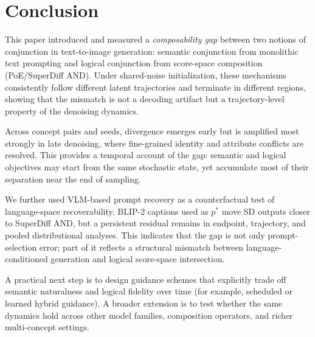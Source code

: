 
\section{Conclusion}

This paper introduced and measured a \emph{composability gap} between two notions of conjunction in text-to-image generation: semantic conjunction from monolithic text prompting and logical conjunction from score-space composition (PoE/SuperDiff AND). Under shared-noise initialization, these mechanisms consistently follow different latent trajectories and terminate in different regions, showing that the mismatch is not a decoding artifact but a trajectory-level property of the denoising dynamics.

Across concept pairs and seeds, divergence emerges early but is amplified most strongly in late denoising, where fine-grained identity and attribute conflicts are resolved. This provides a temporal account of the gap: semantic and logical objectives may start from the same stochastic state, yet accumulate most of their separation near the end of sampling.

We further used VLM-based prompt recovery as a counterfactual test of language-space recoverability. BLIP-2 captions used as \(p^*\) move SD outputs closer to SuperDiff AND, but a persistent residual remains in endpoint, trajectory, and pooled distributional analyses. This indicates that the gap is not only prompt-selection error; part of it reflects a structural mismatch between language-conditioned generation and logical score-space intersection.

A practical next step is to design guidance schemes that explicitly trade off semantic naturalness and logical fidelity over time (for example, scheduled or learned hybrid guidance). A broader extension is to test whether the same dynamics hold across other model families, composition operators, and richer multi-concept settings.
